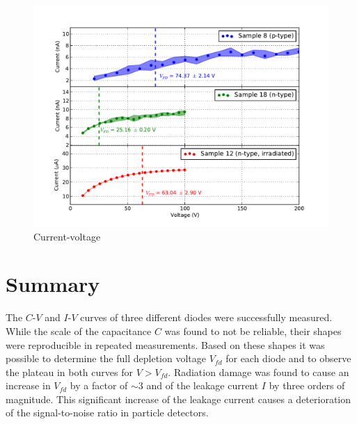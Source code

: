 \documentclass[11pt]{report}
\begin{document}
\begin{figure}
  \centering
  \includegraphics[width=\textwidth]{./figures/iv.pdf}
  \caption{Current-voltage}
  \label{fig:iv}
\end{figure}



\section*{Summary}
\label{sec:summary}

The $C$-$V$ and $I$-$V$ curves of three different diodes were successfully measured.
While the scale of the capacitance $C$ was found to not be reliable, their shapes were reproducible in repeated measurements.
Based on these shapes it was possible to determine the full depletion voltage $V_{fd}$ for each diode and to observe the plateau in both curves for $V>V_{fd}$.
Radiation damage was found to cause an increase in $V_{fd}$ by a factor of $\sim 3$ and of the leakage current $I$ by three orders of magnitude.
This significant increase of the leakage current causes a deterioration of the signal-to-noise ratio in particle detectors.

\printbibliography
\end{document}
